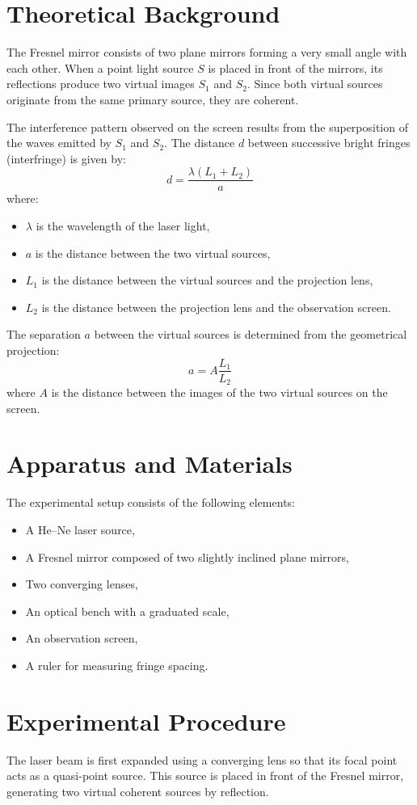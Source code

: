 \documentclass[12pt,a4paper,twoside]{article}
\begin{document}
\section{Theoretical Background}
The Fresnel mirror consists of two plane mirrors forming a very small angle with each other. 
When a point light source $S$ is placed in front of the mirrors, its reflections produce two virtual images $S_1$ and $S_2$.
Since both virtual sources originate from the same primary source, they are coherent.

The interference pattern observed on the screen results from the superposition of the waves emitted by $S_1$ and $S_2$.
The distance $d$ between successive bright fringes (interfringe) is given by:
\[
d = \frac{\lambda (L_1 + L_2)}{a}
\]
where:
\begin{itemize}
    \item $\lambda$ is the wavelength of the laser light,
    \item $a$ is the distance between the two virtual sources,
    \item $L_1$ is the distance between the virtual sources and the projection lens,
    \item $L_2$ is the distance between the projection lens and the observation screen.
\end{itemize}

The separation $a$ between the virtual sources is determined from the geometrical projection:
\[
a = A \frac{L_1}{L_2}
\]
where $A$ is the distance between the images of the two virtual sources on the screen.

\section{Apparatus and Materials}
The experimental setup consists of the following elements:
\begin{itemize}
    \item A He--Ne laser source,
    \item A Fresnel mirror composed of two slightly inclined plane mirrors,
    \item Two converging lenses,
    \item An optical bench with a graduated scale,
    \item An observation screen,
    \item A ruler for measuring fringe spacing.
\end{itemize}

\section{Experimental Procedure}
The laser beam is first expanded using a converging lens so that its focal point acts as a quasi-point source.
This source is placed in front of the Fresnel mirror, generating two virtual coherent sources by reflection.
\end{document}
